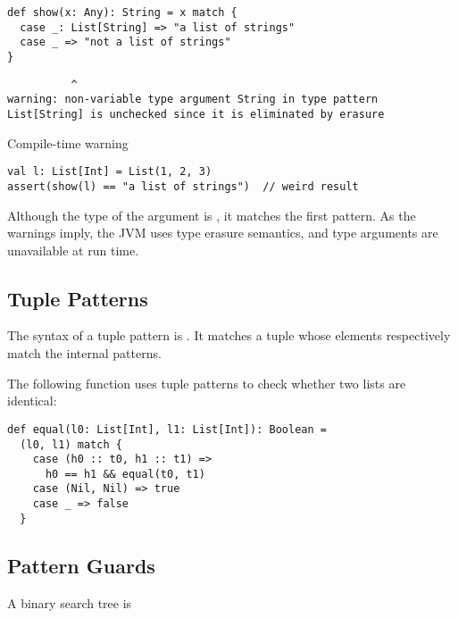 \begin{verbatim}
def show(x: Any): String = x match {
  case _: List[String] => "a list of strings"
  case _ => "not a list of strings"
}
\end{verbatim}
\vspace{-1em}
\begin{mdframed}[hidealllines=true,backgroundcolor=yellow!10,innerleftmargin=3pt,innerrightmargin=3pt,leftmargin=-3pt,rightmargin=-3pt]
\begin{verbatim}
          ^
warning: non-variable type argument String in type pattern
List[String] is unchecked since it is eliminated by erasure
\end{verbatim}
\vspace{-1.5em}
\begin{flushright}
\scriptsize\textsf{Compile-time warning}
\end{flushright}
\end{mdframed}

\begin{verbatim}
val l: List[Int] = List(1, 2, 3)
assert(show(l) == "a list of strings")  // weird result
\end{verbatim}

Although the type of the argument is , it matches the first
pattern. As the warnings imply, the JVM uses type erasure
semantics, and type arguments are unavailable at run time.

\subsection{Tuple Patterns}

The syntax of a tuple pattern is .
It matches a tuple whose elements respectively match the internal patterns.

The following function uses tuple patterns to check
whether two lists are identical:

\begin{verbatim}
def equal(l0: List[Int], l1: List[Int]): Boolean =
  (l0, l1) match {
    case (h0 :: t0, h1 :: t1) =>
      h0 == h1 && equal(t0, t1)
    case (Nil, Nil) => true
    case _ => false
  }
\end{verbatim}

\subsection{Pattern Guards}

A binary search tree is

